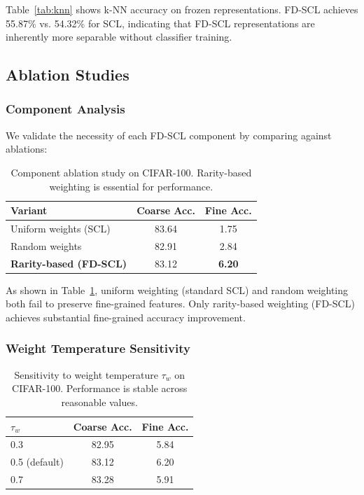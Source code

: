 \documentclass[11pt,a4paper]{article}
\begin{document}
Table~\ref{tab:knn} shows k-NN accuracy on frozen representations. FD-SCL achieves 55.87\% vs. 54.32\% for SCL, indicating that FD-SCL representations are inherently more separable without classifier training.

\subsection{Ablation Studies}

\subsubsection{Component Analysis}

We validate the necessity of each FD-SCL component by comparing against ablations:

\begin{table}[h]
\caption{Component ablation study on CIFAR-100. Rarity-based weighting is essential for performance.}
\label{tab:ablation}
\centering
\begin{tabular}{lcc}
\toprule
Variant & Coarse Acc. & Fine Acc. \\
\midrule
Uniform weights (SCL) & 83.64 & 1.75 \\
Random weights & 82.91 & 2.84 \\
\textbf{Rarity-based (FD-SCL)} & 83.12 & \textbf{6.20} \\
\bottomrule
\end{tabular}
\end{table}

As shown in Table~\ref{tab:ablation}, uniform weighting (standard SCL) and random weighting both fail to preserve fine-grained features. Only rarity-based weighting (FD-SCL) achieves substantial fine-grained accuracy improvement.

\subsubsection{Weight Temperature Sensitivity}

\begin{table}[h]
\caption{Sensitivity to weight temperature $\tau_w$ on CIFAR-100. Performance is stable across reasonable values.}
\label{tab:tau-w}
\centering
\begin{tabular}{lcc}
\toprule
$\tau_w$ & Coarse Acc. & Fine Acc. \\
\midrule
0.3 & 82.95 & 5.84 \\
0.5 (default) & 83.12 & 6.20 \\
0.7 & 83.28 & 5.91 \\
\bottomrule
\end{tabular}
\end{table}
\end{document}
